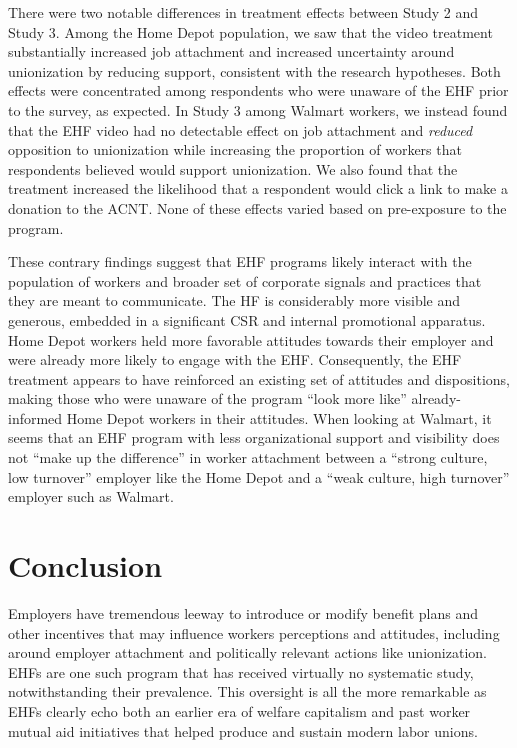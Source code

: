 \documentclass[
  11pt,
  oneside]{article}
\begin{document}
There were two notable differences in treatment effects between Study 2 and Study 3. Among the Home Depot population, we saw that the video treatment substantially increased job attachment and increased uncertainty around unionization by reducing support, consistent with the research hypotheses. Both effects were concentrated among respondents who were unaware of the EHF prior to the survey, as expected. In Study 3 among Walmart workers, we instead found that the EHF video had no detectable effect on job attachment and \emph{reduced} opposition to unionization while increasing the proportion of workers that respondents believed would support unionization. We also found that the treatment increased the likelihood that a respondent would click a link to make a donation to the ACNT. None of these effects varied based on pre-exposure to the program.

These contrary findings suggest that EHF programs likely interact with the population of workers and broader set of corporate signals and practices that they are meant to communicate. The HF is considerably more visible and generous, embedded in a significant CSR and internal promotional apparatus. Home Depot workers held more favorable attitudes towards their employer and were already more likely to engage with the EHF. Consequently, the EHF treatment appears to have reinforced an existing set of attitudes and dispositions, making those who were unaware of the program ``look more like'' already-informed Home Depot workers in their attitudes. When looking at Walmart, it seems that an EHF program with less organizational support and visibility does not ``make up the difference'' in worker attachment between a ``strong culture, low turnover'' employer like the Home Depot and a ``weak culture, high turnover'' employer such as Walmart.

\section{Conclusion}\label{conclusion}

Employers have tremendous leeway to introduce or modify benefit plans and other incentives that may influence workers perceptions and attitudes, including around employer attachment and politically relevant actions like unionization. EHFs are one such program that has received virtually no systematic study, notwithstanding their prevalence. This oversight is all the more remarkable as EHFs clearly echo both an earlier era of welfare capitalism and past worker mutual aid initiatives that helped produce and sustain modern labor unions.
\end{document}
